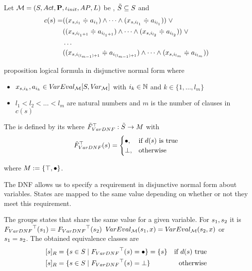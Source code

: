 \documentclass[preview]{standalone}
\begin{document}
\begin{definition}
	Let $\chgph = \chgphtuple$ be \achgphN, $\smstates \subseteq \states$ and 
	\begin{align*}
		c(s) = &((\varstate[,i_1] \eqorneq \varval_{i_1}) \land \dots \land (\varstate[,i_{l_1}] \eqorneq \varval_{i_{l_1}})) \; \lor \\
		&((\varstate[,i_{l_1+1}] \eqorneq \varval_{i_{l_1+1}}) \land \dots \land (\varstate[,i_{l_2}] \eqorneq \varval_{i_{l_2}})) \; \lor  \\
		&\dots \\ 
		&((\varstate[,i_{(l_{m-1})+1}] \eqorneq \varval_{i_{(l_{m-1})+1}}) \land \dots \land (\varstate[,i_{l_m}]  \eqorneq \varval_{i_{l_m}}))
	\end{align*}
	
	proposition logical formula in disjunctive normal form where
	\begin{itemize}
		\item $\varstate[,i_k], a_{i_k} \in \varevalimg$ with $i_k\in \natnums$ and $k \in \{1, \dots, l_m\}$
		\item $l_1 < l_2 < \dots < l_m$ are natural numbers and $m$ is the number of clauses in $c(s)$
	\end{itemize}		
	The \viewN \viewparamdnf is defined by its \grpfctN \gfctparamdnf where $\gfctsubparamdnf : \smstates \to \imggrp$ with
	\[
	\gfctsubparamdnf(\state) =
	\begin{cases}
			\remelem, &\text{if } d(s) \text{ is true}\\
			\notppty, 	&\text{otherwise}
		\end{cases}
	\]
	
	where $\imggrp := \{\group, \remelem\}$.
\end{definition}


The DNF allows us to specify a requirement in disjunctive normal form about variables. States are mapped to the same value depending on whether or not they meet this requirement.

The \viewN \viewparamdnf groups states that share the same value for a given variable. For $\state_1, \state_2$ it is $\gfctparamdnf(\state_1) = \gfctparamdnf(\state_2)$ \iffN $\vareval(\state_1, \var) = \vareval(\state_2, \var)$ or $\state_1 = \state_2$. The obtained equivalence classes are
\begin{align*}
	\eqclassv &= \{\state \in \states \mid \gfctparamdnf(\state) = \remelem\} = \{\state\} &\text{if } d(s) \text{ true} \\
	\eqclassv &= \{\state \in \states \mid \gfctparamdnf(\state) = \notppty\} &\text{otherwise}
\end{align*}
\end{document}
